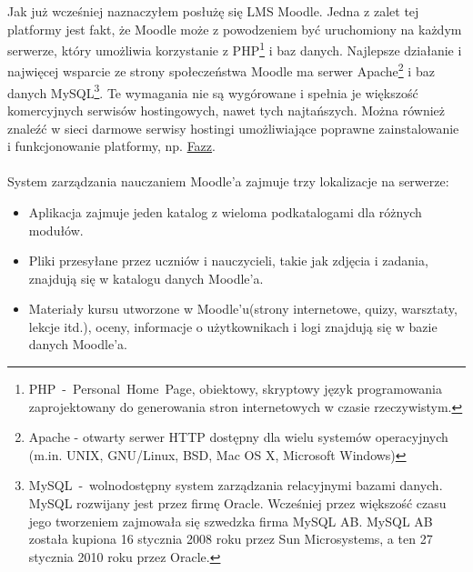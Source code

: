 \hspace{1cm} Jak już wcześniej naznaczyłem posłużę się LMS Moodle. Jedna z zalet tej platformy jest fakt, że Moodle może z powodzeniem być uruchomiony na każdym serwerze, który umożliwia korzystanie z PHP\footnote{PHP~-~Personal~Home~Page, obiektowy, skryptowy język programowania zaprojektowany do generowania stron internetowych w czasie rzeczywistym.} i baz danych. Najlepsze działanie i najwięcej wsparcie ze strony społeczeństwa Moodle ma serwer Apache\footnote{Apache - otwarty serwer HTTP dostępny dla wielu systemów operacyjnych (m.in. UNIX, GNU/Linux, BSD, Mac OS X, Microsoft Windows)} i baz danych MySQL\footnote{MySQL~-~wolnodostępny system zarządzania relacyjnymi bazami danych. MySQL rozwijany jest przez firmę Oracle. Wcześniej przez większość czasu jego tworzeniem zajmowała się szwedzka firma MySQL AB. MySQL AB została kupiona 16 stycznia 2008 roku przez Sun Microsystems, a ten 27 stycznia 2010 roku przez Oracle.}. Te wymagania nie są wygórowane i spełnia je większość komercyjnych serwisów hostingowych, nawet tych najtańszych. Można również znaleźć w sieci darmowe serwisy hostingi umożliwiające poprawne zainstalowanie i funkcjonowanie platformy, np. \href{http://fazz.pl}{Fazz}. \\
\ \\
System zarządzania nauczaniem Moodle'a zajmuje trzy lokalizacje na serwerze:
	\begin{itemize}
		\item Aplikacja zajmuje jeden katalog z wieloma podkatalogami dla różnych modułów.
		\item Pliki przesyłane przez uczniów i nauczycieli, takie jak zdjęcia i zadania, znajdują się w katalogu danych Moodle'a.
		\item Materiały kursu utworzone w Moodle'u(strony internetowe, quizy, warsztaty, lekcje itd.), oceny, informacje o użytkownikach i logi znajdują się w bazie danych Moodle'a.
	\end{itemize}
